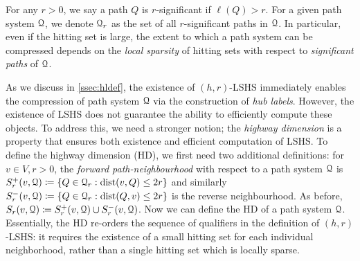 For any $r>0$, we say a path $Q$ is $r$-significant if $\ell(Q)>r$. 
For a given path system $\calQ$, we denote $\calQ_r$ as the set of all $r$-significant paths in $\calQ$.
In particular, even if the hitting set is large, the extent to which a path system can be compressed depends on the \emph{local sparsity} of hitting sets with respect to \emph{significant paths} of $\calQ$.



As we discuss in \cref{ssec:hldef}, the existence of $(h,r)$-LSHS immediately enables the compression of path system $\calQ$ via the construction of \emph{hub labels}. 
However, the existence of LSHS does not guarantee the ability to efficiently compute these objects. 
To address this, we need a stronger notion; the \emph{highway dimension} is a property that ensures both existence and efficient computation of LSHS.
To define the highway dimension (HD), we first need two additional definitions:
for $v\in V, r>0$, the \emph{forward path-neighbourhood} with respect to a path system $\calQ$ is $
S_r^+(v,\calQ) \defeq\crl*{Q\in\calQ_r: \dist(v,Q)\leq 2r}$ and similarly $S_r^-(v,\calQ) \defeq\crl*{Q\in\calQ_r: \dist(Q,v)\leq 2r}$ is the reverse neighbourhood.
As before, $S_r(v,\calQ) \defeq S_r^+(v,\calQ)\cup S_r^-(v,\calQ)$. 
Now we can define the HD of a path system $\calQ$. 
Essentially, the HD re-orders the sequence of qualifiers in the definition of $(h,r)$-LSHS: it requires the existence of a small hitting set for each individual neighborhood, rather than a single hitting set which is locally sparse. 

